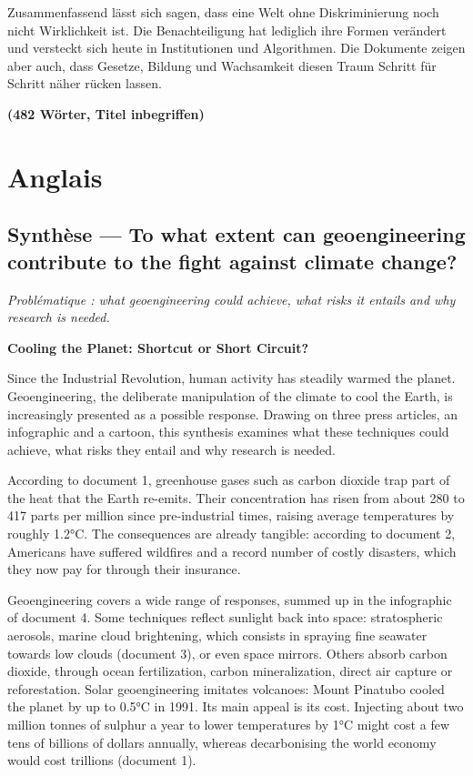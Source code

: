 \documentclass[11pt,a4paper]{article}
\begin{document}
Zusammenfassend lässt sich sagen, dass eine Welt ohne Diskriminierung noch nicht Wirklichkeit ist. Die Benachteiligung hat lediglich ihre Formen verändert und versteckt sich heute in Institutionen und Algorithmen. Die Dokumente zeigen aber auch, dass Gesetze, Bildung und Wachsamkeit diesen Traum Schritt für Schritt näher rücken lassen.

\textbf{(482 Wörter, Titel inbegriffen)}

\hypertarget{anglais}{%
\section{Anglais}\label{anglais}}

\hypertarget{synthuxe8se-to-what-extent-can-geoengineering-contribute-to-the-fight-against-climate-change}{%
\subsection{Synthèse --- To what extent can geoengineering contribute to the fight against climate change?}\label{synthuxe8se-to-what-extent-can-geoengineering-contribute-to-the-fight-against-climate-change}}

\emph{Problématique : what geoengineering could achieve, what risks it entails and why research is needed.}

\textbf{Cooling the Planet: Shortcut or Short Circuit?}

Since the Industrial Revolution, human activity has steadily warmed the planet. Geoengineering, the deliberate manipulation of the climate to cool the Earth, is increasingly presented as a possible response. Drawing on three press articles, an infographic and a cartoon, this synthesis examines what these techniques could achieve, what risks they entail and why research is needed.

According to document 1, greenhouse gases such as carbon dioxide trap part of the heat that the Earth re-emits. Their concentration has risen from about 280 to 417 parts per million since pre-industrial times, raising average temperatures by roughly 1.2°C. The consequences are already tangible: according to document 2, Americans have suffered wildfires and a record number of costly disasters, which they now pay for through their insurance.

Geoengineering covers a wide range of responses, summed up in the infographic of document 4. Some techniques reflect sunlight back into space: stratospheric aerosols, marine cloud brightening, which consists in spraying fine seawater towards low clouds (document 3), or even space mirrors. Others absorb carbon dioxide, through ocean fertilization, carbon mineralization, direct air capture or reforestation. Solar geoengineering imitates volcanoes: Mount Pinatubo cooled the planet by up to 0.5°C in 1991. Its main appeal is its cost. Injecting about two million tonnes of sulphur a year to lower temperatures by 1°C might cost a few tens of billions of dollars annually, whereas decarbonising the world economy would cost trillions (document 1).
\end{document}
